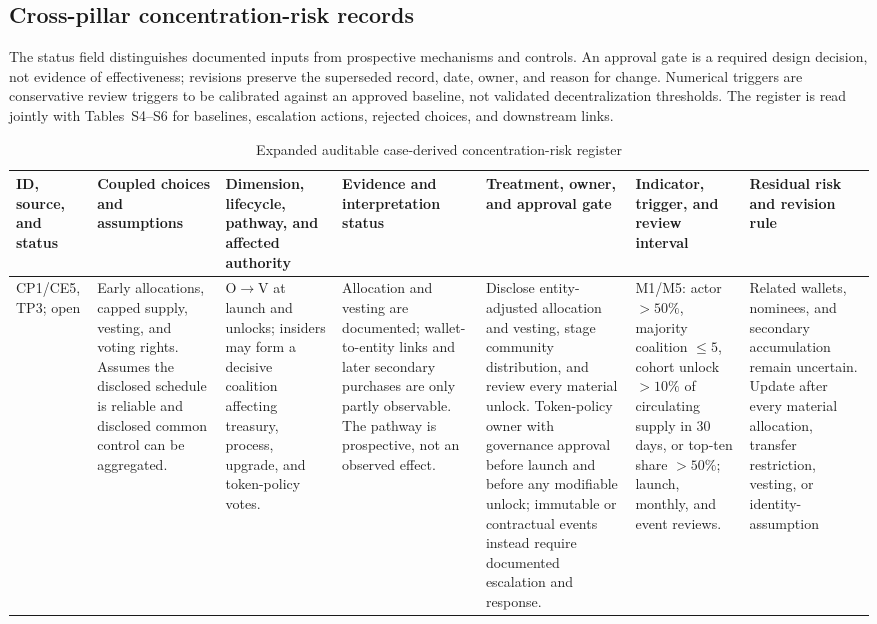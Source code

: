 \documentclass[10pt]{article}
\begin{document}
\clearpage
\begin{landscape}
\section*{Cross-pillar concentration-risk records}
The status field distinguishes documented inputs from prospective mechanisms
and controls. An approval gate is a required design decision, not evidence of
effectiveness; revisions preserve the superseded record, date, owner, and
reason for change. Numerical triggers are conservative review triggers to be
calibrated against an approved baseline, not validated decentralization
thresholds. The register is read jointly with Tables~S4--S6 for baselines,
escalation actions, rejected choices, and downstream links.

\begin{table}[H]
\caption{Expanded auditable case-derived concentration-risk register}
\centering
\scriptsize
\setlength{\tabcolsep}{2.5pt}
\renewcommand{\arraystretch}{1.08}
\begin{tabularx}{\linewidth}{@{}p{.065\linewidth}p{.125\linewidth}p{.165\linewidth}p{.135\linewidth}p{.16\linewidth}p{.15\linewidth}Y@{}}
\toprule
ID, source, and status & Coupled choices and assumptions & Dimension, lifecycle, pathway, and affected authority & Evidence and interpretation status & Treatment, owner, and approval gate & Indicator, trigger, and review interval & Residual risk and revision rule \\
\midrule
CP1/CE5, TP3; open & Early allocations,
capped supply, vesting, and voting rights. Assumes the disclosed schedule is
reliable and disclosed common control can be aggregated. & O$\rightarrow$V at
launch and unlocks; insiders may form a decisive coalition affecting treasury,
process, upgrade, and token-policy votes. & Allocation and vesting are
documented; wallet-to-entity links and later secondary purchases are only
partly observable. The pathway is prospective, not an observed effect. &
Disclose entity-adjusted allocation and vesting, stage community distribution,
and review every material unlock. Token-policy owner with governance approval
before launch and before any modifiable unlock; immutable or contractual events
instead require documented escalation and response. & M1/M5: actor $>50\%$, majority
coalition $\leq5$, cohort unlock $>10\%$ of circulating supply in 30 days, or
top-ten share $>50\%$; launch, monthly, and event reviews. & Related wallets,
nominees, and secondary accumulation remain uncertain. Update after every
material allocation, transfer restriction, vesting, or identity-assumption

\end{tabularx}
\end{table}
\end{landscape}
\end{document}
